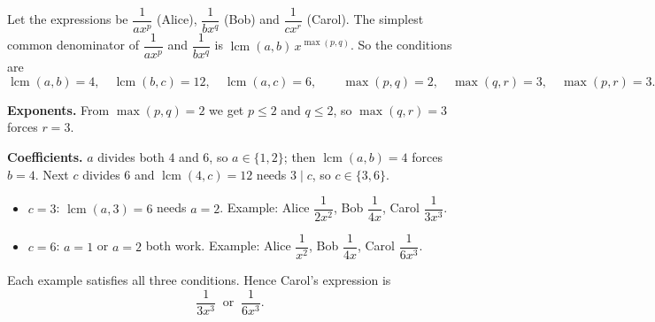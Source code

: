 Let the expressions be $\dfrac{1}{ax^p}$ (Alice), $\dfrac{1}{bx^q}$ (Bob) and $\dfrac{1}{cx^r}$ (Carol). The simplest common denominator of $\dfrac{1}{ax^p}$ and $\dfrac{1}{bx^q}$ is $\operatorname{lcm}(a,b)\,x^{\max(p,q)}$. So the conditions are
\[
\operatorname{lcm}(a,b)=4,\quad \operatorname{lcm}(b,c)=12,\quad \operatorname{lcm}(a,c)=6,\qquad \max(p,q)=2,\quad \max(q,r)=3,\quad \max(p,r)=3 .
\]

\textbf{Exponents.} From $\max(p,q)=2$ we get $p\le2$ and $q\le2$, so $\max(q,r)=3$ forces $r=3$.

\textbf{Coefficients.} $a$ divides both $4$ and $6$, so $a\in\{1,2\}$; then $\operatorname{lcm}(a,b)=4$ forces $b=4$. Next $c$ divides $6$ and $\operatorname{lcm}(4,c)=12$ needs $3\mid c$, so $c\in\{3,6\}$.
\begin{itemize}
\item $c=3$: $\operatorname{lcm}(a,3)=6$ needs $a=2$. Example: Alice $\dfrac{1}{2x^2}$, Bob $\dfrac{1}{4x}$, Carol $\dfrac{1}{3x^3}$.
\item $c=6$: $a=1$ or $a=2$ both work. Example: Alice $\dfrac{1}{x^2}$, Bob $\dfrac{1}{4x}$, Carol $\dfrac{1}{6x^3}$.
\end{itemize}
Each example satisfies all three conditions. Hence Carol's expression is
\[
\boxed{\dfrac{1}{3x^3}\ \text{ or }\ \dfrac{1}{6x^3}} .
\]
